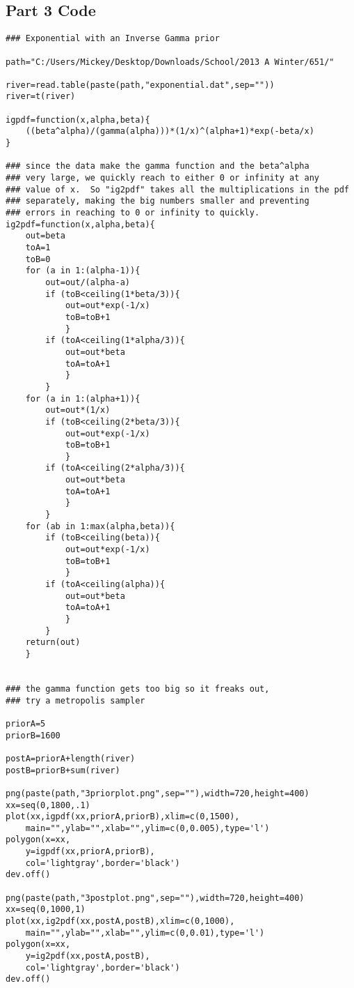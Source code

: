 \documentclass[12pt]{article}
\begin{document}
\subsection*{Part 3 Code}
\begin{scriptsize}
\begin{verbatim}
### Exponential with an Inverse Gamma prior

path="C:/Users/Mickey/Desktop/Downloads/School/2013 A Winter/651/"

river=read.table(paste(path,"exponential.dat",sep=""))
river=t(river)

igpdf=function(x,alpha,beta){
    ((beta^alpha)/(gamma(alpha)))*(1/x)^(alpha+1)*exp(-beta/x)
}

### since the data make the gamma function and the beta^alpha 
### very large, we quickly reach to either 0 or infinity at any
### value of x.  So "ig2pdf" takes all the multiplications in the pdf
### separately, making the big numbers smaller and preventing
### errors in reaching to 0 or infinity to quickly.
ig2pdf=function(x,alpha,beta){
    out=beta
    toA=1
    toB=0
    for (a in 1:(alpha-1)){
        out=out/(alpha-a)
        if (toB<ceiling(1*beta/3)){
            out=out*exp(-1/x)
            toB=toB+1
            }
        if (toA<ceiling(1*alpha/3)){
            out=out*beta
            toA=toA+1
            }
        }
    for (a in 1:(alpha+1)){
        out=out*(1/x)
        if (toB<ceiling(2*beta/3)){
            out=out*exp(-1/x)
            toB=toB+1
            }
        if (toA<ceiling(2*alpha/3)){
            out=out*beta
            toA=toA+1
            }
        }
    for (ab in 1:max(alpha,beta)){
        if (toB<ceiling(beta)){
            out=out*exp(-1/x)
            toB=toB+1
            }
        if (toA<ceiling(alpha)){
            out=out*beta
            toA=toA+1
            }
        }
    return(out)
    }


### the gamma function gets too big so it freaks out,
### try a metropolis sampler

priorA=5
priorB=1600

postA=priorA+length(river)
postB=priorB+sum(river)

png(paste(path,"3priorplot.png",sep=""),width=720,height=400)
xx=seq(0,1800,.1)
plot(xx,igpdf(xx,priorA,priorB),xlim=c(0,1500),
    main="",ylab="",xlab="",ylim=c(0,0.005),type='l')
polygon(x=xx,
    y=igpdf(xx,priorA,priorB),
    col='lightgray',border='black')
dev.off()

png(paste(path,"3postplot.png",sep=""),width=720,height=400)
xx=seq(0,1000,1)
plot(xx,ig2pdf(xx,postA,postB),xlim=c(0,1000),
    main="",ylab="",xlab="",ylim=c(0,0.01),type='l')
polygon(x=xx,
    y=ig2pdf(xx,postA,postB),
    col='lightgray',border='black')
dev.off()


\end{verbatim}
\end{scriptsize}
\end{document}
